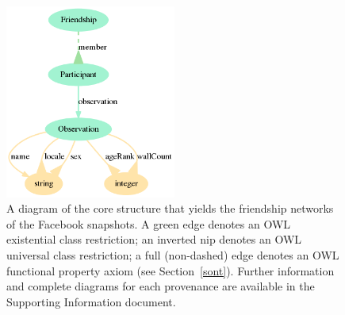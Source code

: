 \documentclass[data,datadescriptor,submit,moreauthors,pdftex]{Definitions/mdpi}
\begin{document}
\begin{figure}[H]
    \centering
    \includegraphics[width=0.5\textwidth]{../ontologies/facebook-legacy-AntonioAnzoategui18022013Friendship.ttl/draw}
    \caption{A diagram of the core structure that yields the friendship networks
    of the Facebook snapshots. A green edge denotes an OWL existential class restriction; an inverted nip denotes an OWL universal class restriction; a full (non-dashed) edge denotes an OWL functional property axiom (see Section~\ref{sont}). Further information and complete diagrams for each provenance are available in the Supporting Information document.}\label{dia}
\end{figure}
\end{document}
